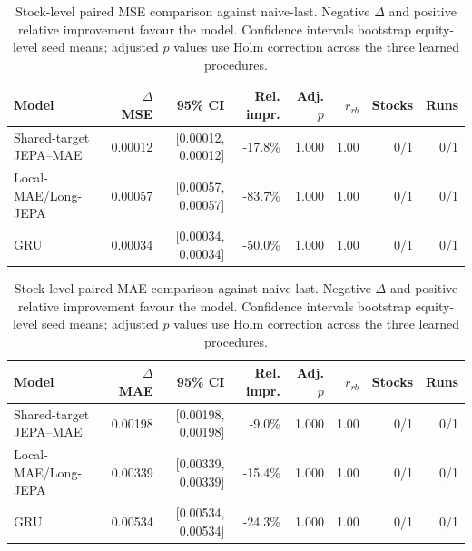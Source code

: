 \begin{table}[t]
\centering
\small
\caption{Stock-level paired MSE comparison against naive-last. Negative $\Delta$ and positive relative improvement favour the model. Confidence intervals bootstrap equity-level seed means; adjusted $p$ values use Holm correction across the three learned procedures.}
\label{tab:paired_mse_naive}
\begin{tabular}{lrrrrrrr}
\toprule
Model & $\Delta$MSE & 95\% CI & Rel. impr. & Adj. $p$ & $r_{rb}$ & Stocks & Runs \\
\midrule
Shared-target JEPA--MAE & 0.00012 & [0.00012, 0.00012] & -17.8\% & 1.000 & 1.00 & 0/1 & 0/1 \\
Local-MAE/Long-JEPA & 0.00057 & [0.00057, 0.00057] & -83.7\% & 1.000 & 1.00 & 0/1 & 0/1 \\
GRU & 0.00034 & [0.00034, 0.00034] & -50.0\% & 1.000 & 1.00 & 0/1 & 0/1 \\
\bottomrule
\end{tabular}
\end{table}

\begin{table}[t]
\centering
\small
\caption{Stock-level paired MAE comparison against naive-last. Negative $\Delta$ and positive relative improvement favour the model. Confidence intervals bootstrap equity-level seed means; adjusted $p$ values use Holm correction across the three learned procedures.}
\label{tab:paired_mae_naive}
\begin{tabular}{lrrrrrrr}
\toprule
Model & $\Delta$MAE & 95\% CI & Rel. impr. & Adj. $p$ & $r_{rb}$ & Stocks & Runs \\
\midrule
Shared-target JEPA--MAE & 0.00198 & [0.00198, 0.00198] & -9.0\% & 1.000 & 1.00 & 0/1 & 0/1 \\
Local-MAE/Long-JEPA & 0.00339 & [0.00339, 0.00339] & -15.4\% & 1.000 & 1.00 & 0/1 & 0/1 \\
GRU & 0.00534 & [0.00534, 0.00534] & -24.3\% & 1.000 & 1.00 & 0/1 & 0/1 \\
\bottomrule
\end{tabular}
\end{table}
